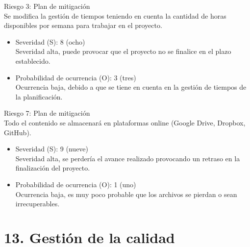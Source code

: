 \documentclass[11pt]{charter}
\begin{document}
Riesgo 3: Plan de mitigación \\
Se modifica la gestión de tiempos teniendo en cuenta la cantidad de horas disponibles por semana para trabajar en el proyecto.
\begin{itemize}
\item Severidad (S): 8 (ocho) \\
Severidad alta, puede provocar que el proyecto no se finalice en el plazo establecido.
\item Probabilidad de ocurrencia (O): 3 (tres) \\
Ocurrencia baja, debido a que se tiene en cuenta en la gestión de tiempos de la planificación.
\end{itemize} 

Riesgo 7: Plan de mitigación \\
Todo el contenido se almacenará en plataformas online (Google Drive, Dropbox, GitHub).
\begin{itemize}
\item Severidad (S): 9 (nueve) \\
Severidad alta, se perdería el avance realizado provocando un retraso en la finalización del proyecto.
\item Probabilidad de ocurrencia (O): 1 (uno) \\
Ocurrencia baja, es muy poco probable que los archivos se pierdan o sean irrecuperables.
\end{itemize}

\section{13. Gestión de la calidad}
\label{sec:calidad}
\end{document}
